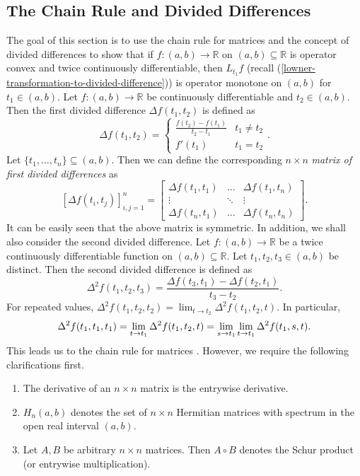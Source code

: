 \documentclass[12pt,a4paper]{amsart}
\theoremstyle{definition}
\begin{document}
	\subsection{The Chain Rule and Divided Differences}
	The goal of this section is to use the chain rule for matrices and the concept of divided differences to show that if $f: (a, b) \rightarrow \mathbb{R}$ on $(a, b) \subseteq \mathbb{R}$ is operator convex and twice continuously differentiable, then $L_{t_1}f$ (recall (\ref{lowner-transformation-to-divided-difference})) is operator monotone on $(a, b)$ for $t_1 \in (a, b)$.  Let $f: (a, b) \rightarrow \mathbb{R}$ be continuously differentiable and $t_2 \in (a, b)$. Then the first divided difference $\Delta f(t_1, t_2)$ is defined as
	\[
	\Delta f (t_1,t_2) = 
	\begin{cases} 
		\frac{f(t_2) - f(t_1)}{t_2 - t_1} &  t_1 \neq t_2 \\
		f'(t_1) & t_1=t_2
	\end{cases}.
	\]
	Let $\lbrace t_1, \ldots, t_n \rbrace \subseteq (a, b)$. Then we can define the corresponding $n \times n$ \emph{matrix of first divided differences} as  
	\[ [\Delta f(t_i, t_j)]_{i, j = 1}^{n}  = \begin{bmatrix}
		\Delta f(t_1, t_1) & \ldots & \Delta f(t_1, t_n) \\
		\vdots & \ddots  & \vdots \\
		\Delta f(t_n, t_1) & \ldots & \Delta f(t_n, t_n)
	\end{bmatrix}.\]
	\noindent
	It can be easily seen that the above matrix is symmetric. In addition, we shall also consider the second divided difference. Let $f: (a, b) \rightarrow \mathbb{R}$ be a twice continuously differentiable function on $(a, b) \subseteq \mathbb{R}$. Let $t_1, t_2, t_3 \in (a, b)$  be distinct. Then the second divided difference is defined as
	\begin{equation}\label{second-divided-difference-equation}
		\Delta^{2} f(t_1, t_2, t_3) = \frac{\Delta f(t_3, t_1) - \Delta f(t_2, t_1) }{t_3 - t_2}.
	\end{equation}
	For repeated values, $\Delta^{2} f(t_1, t_2, t_2) = \lim_{t \rightarrow t_2} \Delta^{2} f(t_1, t_2, t)$. In particular,
	\[ \Delta^{2} f(t_1, t_1, t_1)  = \lim_{t \rightarrow t_1} \Delta^{2} f(t_1, t_2, t) \\ = \lim_{s \rightarrow t_1} \lim_{t \rightarrow t_1} \Delta^{2} f(t_1, s, t). \]
	This leads us to the chain rule for matrices \cite[Theorem 6.6.30]{horn-book}. However, we require the following  clarifications first.
	\begin{enumerate}[label=\textnormal{(\Roman*)}]
		\item The derivative of an $n \times n$ matrix is the entrywise derivative. 
		\item $H_n(a,b)$ denotes the set of $n \times n$ Hermitian matrices with spectrum in the open real interval $(a, b)$.
		\item Let $A, B$  be arbitrary $n \times n$ matrices. Then $A \circ B$ denotes the Schur product (or entrywise multiplication).
	\end{enumerate}
	
\end{document}

